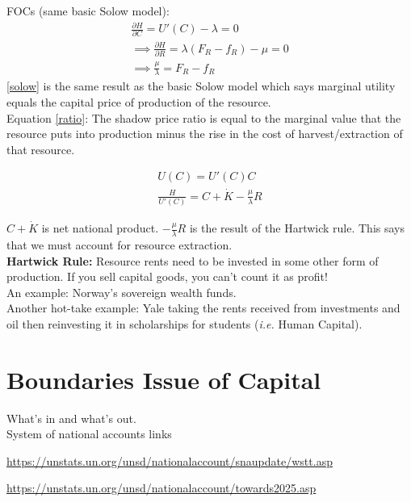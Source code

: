 \documentclass[12pt]{article}
\begin{document}
FOCs (same basic Solow model):
\begin{align}
    \frac{\partial H}{\partial C}= U'(C) - \lambda =0 \label{solow}\\
    \implies 
    \frac{\partial H}{\partial R} = \lambda(F_R - f_R) - \mu = 0\\
    \implies \frac{\mu}{\lambda} = F_R - f_R \label{ratio}
\end{align}
\ref{solow} is the same result as the basic Solow model which says marginal utility equals the capital price of production of the resource. \\

Equation \ref{ratio}: The shadow price ratio is equal to the marginal value that the resource puts into production minus the rise in the cost of harvest/extraction of that resource. 

\begin{align}
    U(C) = U'(C) C \\
    \frac{H}{U'(C)} = C + \dot K - \frac{\mu}{\lambda} R \label{key_result}
\end{align}


$C + \dot K$ is net national product. $- \frac{\mu}{\lambda} R$ is the result of the Hartwick rule. This says that we must account for resource extraction. \\

\textbf{Hartwick Rule: }Resource rents need to be invested in some other form of production. If you sell capital goods, you can't count it as profit! \\

An example: Norway's sovereign wealth funds. \\

Another hot-take example: Yale taking the rents received from investments and oil then reinvesting it in scholarships for students (\textit{i.e.} Human Capital). \\

\section{Boundaries Issue of Capital}
What's in and what's out. \\


System of national accounts links 

\url{https://unstats.un.org/unsd/nationalaccount/snaupdate/wstt.asp}

\url{https://unstats.un.org/unsd/nationalaccount/towards2025.asp
}
 
\end{document}
